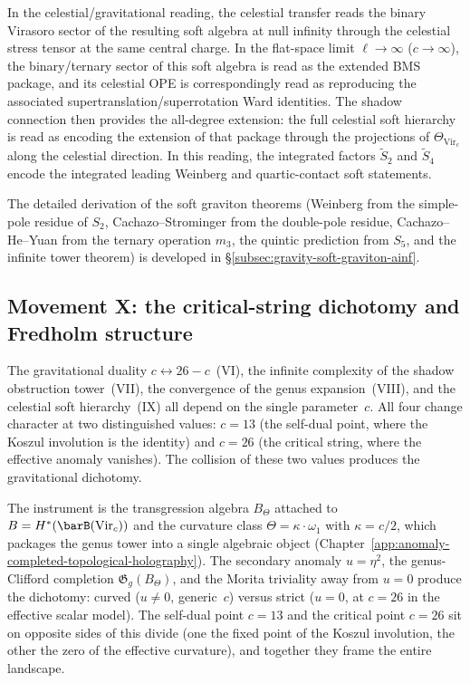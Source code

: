 In the celestial/gravitational reading, the celestial transfer reads
the binary Virasoro sector of the resulting soft algebra at null infinity
through the celestial stress tensor at the same central charge. In
the flat-space limit
$\ell \to \infty$ ($c \to \infty$), the binary/ternary sector of this
soft algebra is read as the extended BMS package, and its celestial
OPE is correspondingly read as reproducing the associated
supertranslation/superrotation Ward identities. The shadow connection then
provides the all-degree extension: the full celestial soft hierarchy is
read as encoding the extension of that package through the projections of
$\Theta_{\mathrm{Vir}_c}$ along the celestial direction. In this
reading, the integrated factors $\widetilde{S}_2$ and
$\widetilde{S}_4$ encode the integrated leading Weinberg and
quartic-contact soft statements.


The detailed derivation of the soft graviton theorems
(Weinberg from the simple-pole residue of $S_2$,
Cachazo--Strominger from the double-pole residue,
Cachazo--He--Yuan from the ternary operation $m_3$,
the quintic prediction from $S_5$, and the infinite
tower theorem) is developed in
\S\ref{subsec:gravity-soft-graviton-ainf}.


\subsection{Movement X: the critical-string dichotomy and Fredholm
structure}
\label{subsec:gravity-critical-string-fredholm}

The gravitational duality $c \leftrightarrow 26-c$~(VI), the
infinite complexity of the shadow obstruction tower~(VII), the
convergence of the genus expansion~(VIII), and the celestial soft
hierarchy~(IX) all depend on the single parameter~$c$. All four
change character at two distinguished values: $c = 13$ (the
self-dual point, where the Koszul involution is the identity) and
$c = 26$ (the critical string, where the effective anomaly
vanishes). The collision of these two values produces the
gravitational dichotomy.

The instrument is the transgression algebra $B_\Theta$ attached to
$B = H^*(\barB(\mathrm{Vir}_c))$ and the curvature class
$\Theta = \kappa \cdot \omega_1$ with $\kappa = c/2$, which
packages the genus tower into a single algebraic object
(Chapter~\ref{app:anomaly-completed-topological-holography}).
The secondary anomaly $u = \eta^2$, the genus-Clifford completion
$\mathfrak{G}_g(B_\Theta)$, and the Morita triviality away from
$u = 0$ produce the dichotomy: curved ($u \ne 0$, generic~$c$)
versus strict ($u = 0$, at $c = 26$ in the effective scalar model). The self-dual point $c = 13$
and the critical point $c = 26$ sit on opposite sides of this
divide (one the fixed point of the Koszul involution, the
other the zero of the effective curvature), and together they
frame the entire landscape.

